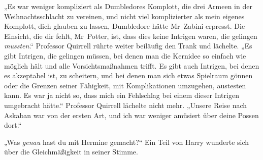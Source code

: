 „Es war weniger kompliziert als Dumbledores Komplott, die drei Armeen in der Weihnachtsschlacht zu vereinen, und nicht viel komplizierter als mein eigenes Komplott, dich glauben zu lassen, Dumbledore hätte Mr~Zabini erpresst. Die Einsicht, die dir fehlt, Mr~Potter, ist, dass dies keine Intrigen waren, die gelingen \emph{mussten}.“
Professor Quirrell rührte weiter beiläufig den Trank und lächelte.
„Es gibt Intrigen, die gelingen müssen, bei denen man die Kernidee so einfach wie möglich hält und alle Vorsichtsmaßnahmen trifft. Es gibt auch Intrigen, bei denen es akzeptabel ist, zu scheitern, und bei denen man sich etwas Spielraum gönnen oder die Grenzen seiner Fähigkeit, mit Komplikationen umzugehen, austesten kann. Es war ja nicht so, dass mich ein Fehlschlag bei einem dieser Intrigen umgebracht hätte.“
Professor Quirrell lächelte nicht mehr.
„Unsere Reise nach Askaban war von der ersten Art, und ich war weniger amüsiert über deine Possen dort.“

„Was \emph{genau} hast du mit Hermine gemacht?“
Ein Teil von Harry wunderte sich über die Gleichmäßigkeit in seiner Stimme.


